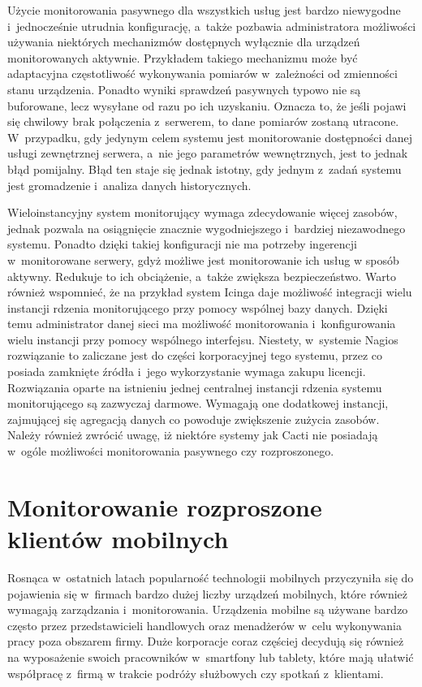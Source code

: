 Użycie monitorowania pasywnego dla wszystkich usług jest bardzo
niewygodne i~jednocześnie utrudnia konfigurację, a~także pozbawia
administratora możliwości używania niektórych mechanizmów dostępnych
wyłącznie dla urządzeń monitorowanych aktywnie. Przykładem takiego
mechanizmu może być adaptacyjna częstotliwość wykonywania pomiarów
w~zależności od zmienności stanu urządzenia. Ponadto wyniki sprawdzeń
pasywnych typowo nie są buforowane, lecz wysyłane od razu po ich
uzyskaniu. Oznacza to, że jeśli pojawi się chwilowy brak połączenia
z~serwerem, to dane pomiarów zostaną utracone. W~przypadku, gdy
jedynym celem systemu jest monitorowanie dostępności danej usługi
zewnętrznej serwera, a~nie jego parametrów wewnętrznych, jest to jednak
błąd pomijalny. Błąd ten staje się jednak istotny, gdy jednym z~zadań
systemu jest gromadzenie i~analiza danych historycznych.

Wieloinstancyjny system monitorujący wymaga zdecydowanie więcej
zasobów, jednak pozwala na osiągnięcie znacznie wygodniejszego
i~bardziej niezawodnego systemu. Ponadto dzięki takiej konfiguracji
nie ma potrzeby ingerencji w~monitorowane serwery, gdyż możliwe jest
monitorowanie ich usług w sposób aktywny. Redukuje to ich obciążenie,
a~także zwiększa bezpieczeństwo. Warto również wspomnieć, że na
przykład system Icinga daje możliwość integracji wielu instancji
rdzenia monitorującego przy pomocy wspólnej bazy danych. Dzięki temu
administrator danej sieci ma możliwość monitorowania i~konfigurowania
wielu instancji przy pomocy wspólnego interfejsu. Niestety, w~systemie
Nagios rozwiązanie to zaliczane jest do części korporacyjnej tego
systemu, przez co posiada zamknięte źródła i~jego wykorzystanie wymaga
zakupu licencji. Rozwiązania oparte na istnieniu jednej centralnej
instancji rdzenia systemu monitorującego są zazwyczaj
darmowe. Wymagają one dodatkowej instancji, zajmującej się agregacją
danych co powoduje zwiększenie zużycia zasobów. Należy również zwrócić
uwagę, iż niektóre systemy jak Cacti nie posiadają w~ogóle możliwości
monitorowania pasywnego czy rozproszonego.

\section[Monitorowanie rozproszone][Monitorowanie rozproszone klientów
mobilnych]{Monitorowanie rozproszone klientów mobilnych}

Rosnąca w~ostatnich latach popularność technologii mobilnych
przyczyniła się do pojawienia się w~firmach bardzo dużej liczby
urządzeń mobilnych, które również wymagają zarządzania
i~monitorowania. Urządzenia mobilne są używane bardzo często przez
przedstawicieli handlowych oraz menadżerów w~celu wykonywania pracy
poza obszarem firmy. Duże korporacje coraz częściej decydują się
również na wyposażenie swoich pracowników w~smartfony lub tablety,
które mają ułatwić współpracę z~firmą w trakcie podróży służbowych czy
spotkań z~klientami.

